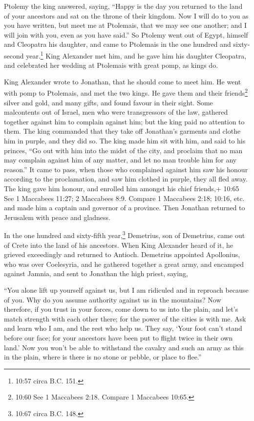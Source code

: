  Ptolemy the king answered, saying, ``Happy is the day you
returned to the land of your ancestors and sat on the throne of their
kingdom.  Now I will do to you as you have written, but
meet me at Ptolemais, that we may see one another; and I will join with
you, even as you have said.''  So Ptolemy went out of
Egypt, himself and Cleopatra his daughter, and came to Ptolemais in the
one hundred and sixty-second year.\footnote{10:57 circa B.C. 151.}
 King Alexander met him, and he gave him his daughter
Cleopatra, and celebrated her wedding at Ptolemais with great pomp, as
kings do.

 King Alexander wrote to Jonathan, that he should come to
meet him.  He went with pomp to Ptolemais, and met the two
kings. He gave them and their friends\footnote{10:60 See 1 Maccabees
  2:18. Compare 1 Maccabees 10:65.} silver and gold, and many gifts, and
found favour in their sight.  Some malcontents out of
Israel, men who were transgressors of the law, gathered together against
him to complain against him; but the king paid no attention to them.
 The king commanded that they take off Jonathan's garments
and clothe him in purple, and they did so.  The king made
him sit with him, and said to his princes, ``Go out with him into the
midst of the city, and proclaim that no man may complain against him of
any matter, and let no man trouble him for any reason.'' 
It came to pass, when those who complained against him saw his honour
according to the proclamation, and saw him clothed in purple, they all
fled away.  The king gave him honour, and enrolled him
amongst his chief friends,+ 10:65 See 1 Maccabees 11:27; 2 Maccabees
8:9. Compare 1 Maccabees 2:18; 10:16, etc. and made him a captain and
governor of a province.  Then Jonathan returned to
Jerusalem with peace and gladness.

 In the one hundred and sixty-fifth year,\footnote{10:67
  circa B.C. 148.} Demetrius, son of Demetrius, came out of Crete into
the land of his ancestors.  When King Alexander heard of
it, he grieved exceedingly and returned to Antioch. 
Demetrius appointed Apollonius, who was over Coelesyria, and he gathered
together a great army, and encamped against Jamnia, and sent to Jonathan
the high priest, saying,

 ``You alone lift up yourself against us, but I am
ridiculed and in reproach because of you. Why do you assume authority
against us in the mountains?  Now therefore, if you trust
in your forces, come down to us into the plain, and let's match strength
with each other there; for the power of the cities is with me.
 Ask and learn who I am, and the rest who help us. They
say, `Your foot can't stand before our face; for your ancestors have
been put to flight twice in their own land.'  Now you won't
be able to withstand the cavalry and such an army as this in the plain,
where is there is no stone or pebble, or place to flee.''

